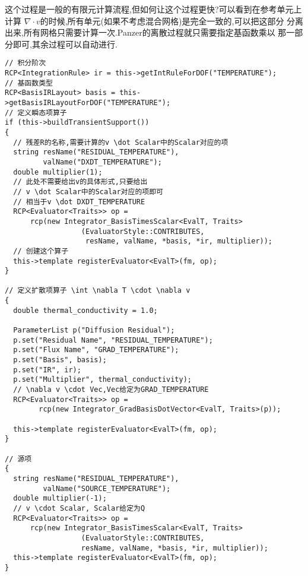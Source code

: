 这个过程是一般的有限元计算流程,但如何让这个过程更快?可以看到在参考单元上计算
$\nabla\cdot v$的时候,所有单元(如果不考虑混合网格)是完全一致的,可以把这部分
分离出来,所有网格只需要计算一次.Panzer的离散过程就只需要指定基函数乘以
那一部分即可,其余过程可以自动进行.
\begin{lstlisting}
// 积分阶次
RCP<IntegrationRule> ir = this->getIntRuleForDOF("TEMPERATURE");
// 基函数类型
RCP<BasisIRLayout> basis = this->getBasisIRLayoutForDOF("TEMPERATURE");
// 定义瞬态项算子
if (this->buildTransientSupport())
{
  // 残差R的名称,需要计算的v \dot Scalar中的Scalar对应的项
  string resName("RESIDUAL_TEMPERATURE"), 
         valName("DXDT_TEMPERATURE");
  double multiplier(1);
  // 此处不需要给出v的具体形式,只要给出
  // v \dot Scalar中的Scalar对应的项即可
  // 相当于v \dot DXDT_TEMPERATURE 
  RCP<Evaluator<Traits>> op = 
      rcp(new Integrator_BasisTimesScalar<EvalT, Traits>
                  (EvaluatorStyle::CONTRIBUTES,
                   resName, valName, *basis, *ir, multiplier));
  // 创建这个算子
  this->template registerEvaluator<EvalT>(fm, op);
}

// 定义扩散项算子 \int \nabla T \cdot \nabla v
{
  double thermal_conductivity = 1.0;

  ParameterList p("Diffusion Residual");
  p.set("Residual Name", "RESIDUAL_TEMPERATURE");
  p.set("Flux Name", "GRAD_TEMPERATURE");
  p.set("Basis", basis);
  p.set("IR", ir);
  p.set("Multiplier", thermal_conductivity);
  // \nabla v \cdot Vec,Vec给定为GRAD_TEMPERATURE
  RCP<Evaluator<Traits>> op = 
        rcp(new Integrator_GradBasisDotVector<EvalT, Traits>(p));

  this->template registerEvaluator<EvalT>(fm, op);
}

// 源项
{
  string resName("RESIDUAL_TEMPERATURE"),
         valName("SOURCE_TEMPERATURE");
  double multiplier(-1);
  // v \cdot Scalar, Scalar给定为Q
  RCP<Evaluator<Traits>> op = 
      rcp(new Integrator_BasisTimesScalar<EvalT, Traits>
                  (EvaluatorStyle::CONTRIBUTES,
                  resName, valName, *basis, *ir, multiplier));
  this->template registerEvaluator<EvalT>(fm, op);
}
\end{lstlisting}